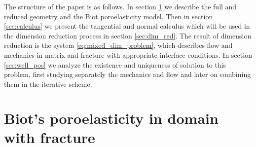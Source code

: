 \documentclass[a4paper]{article}
\numberwithin{equation}{section}
\begin{document}
The structure of the paper is as follows.
In section \ref{sec:model} we describe the full and reduced geometry and the Biot poroelasticity model.
Then in section \ref{sec:calculus} we present the tangential and normal calculus which will be used in the dimension reduction process in section \ref{sec:dim_red}.
The result of dimension reduction is the system \eqref{eq:mixed_dim_problem}, which describes flow and mechanics in matrix and fracture with appropriate interface conditions.
In section \ref{sec:well_pos} we analyze the existence and uniqueness of solution to this problem, first studying separately the mechanics and flow and later on combining them in the iterative scheme.


\section{Biot's poroelasticity in domain with fracture}\label{sec:model}
\end{document}
